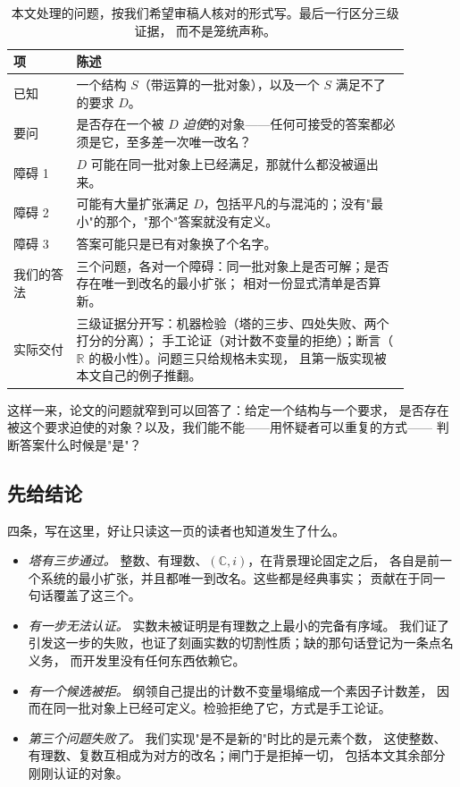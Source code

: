 \documentclass[aps,prd,preprint,superscriptaddress,amsmath,amssymb]{revtex4-2}
\begin{document}
\begin{table}[t]
\caption{本文处理的问题，按我们希望审稿人核对的形式写。最后一行区分三级证据，
而不是笼统声称。}
\label{tab:problem}
\begin{ruledtabular}
\begin{tabular}{p{0.14\linewidth}p{0.74\linewidth}}
项 & 陈述 \\
\hline
已知 & 一个结构 $S$（带运算的一批对象），以及一个 $S$ 满足不了的要求 $D$。\\
要问 & 是否存在一个被 $D$ \emph{迫使}的对象——任何可接受的答案都必须是它，至多差一次唯一改名？\\
障碍 1 & $D$ 可能在同一批对象上已经满足，那就什么都没被逼出来。\\
障碍 2 & 可能有大量扩张满足 $D$，包括平凡的与混沌的；没有"最小"的那个，"那个"答案就没有定义。\\
障碍 3 & 答案可能只是已有对象换了个名字。\\
我们的答法 & 三个问题，各对一个障碍：同一批对象上是否可解；是否存在唯一到改名的最小扩张；
相对一份显式清单是否算新。\\
实际交付 & 三级证据分开写：机器检验（塔的三步、四处失败、两个打分的分离）；
手工论证（对计数不变量的拒绝）；断言（$\mathbb{R}$ 的极小性）。问题三只给规格未实现，
且第一版实现被本文自己的例子推翻。\\
\end{tabular}
\end{ruledtabular}
\end{table}

这样一来，论文的问题就窄到可以回答了：给定一个结构与一个要求，
是否存在被这个要求迫使的对象？以及，我们能不能——用怀疑者可以重复的方式——
判断答案什么时候是"是"？

\subsection*{先给结论}

四条，写在这里，好让只读这一页的读者也知道发生了什么。

\begin{itemize}
\item \emph{塔有三步通过。} 整数、有理数、$(\mathbb{C},i)$，在背景理论固定之后，
      各自是前一个系统的最小扩张，并且都唯一到改名。这些都是经典事实；
      贡献在于同一句话覆盖了这三个。
\item \emph{有一步无法认证。} 实数未被证明是有理数之上最小的完备有序域。
      我们证了引发这一步的失败，也证了刻画实数的切割性质；缺的那句话登记为一条点名义务，
      而开发里没有任何东西依赖它。
\item \emph{有一个候选被拒。} 纲领自己提出的计数不变量塌缩成一个素因子计数差，
      因而在同一批对象上已经可定义。检验拒绝了它，方式是手工论证。
\item \emph{第三个问题失败了。} 我们实现"是不是新的"时比的是元素个数，
      这使整数、有理数、复数互相成为对方的改名；闸门于是拒掉一切，
      包括本文其余部分刚刚认证的对象。
\end{itemize}
\end{document}
